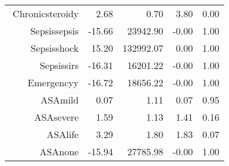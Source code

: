\begin{tabular}{rrrrr}
$$  Chronic\-steroid\-y & 2.68 & 0.70 & 3.80 & 0.00 \\ 
  Sepsis\-sepsis & -15.66 & 23942.90 & -0.00 & 1.00 \\ 
  Sepsis\-shock & 15.20 & 132992.07 & 0.00 & 1.00 \\ 
  Sepsis\-sirs & -16.31 & 16201.22 & -0.00 & 1.00 \\ 
  Emergency\-y & -16.72 & 18656.22 & -0.00 & 1.00 \\ 
  ASA\-mild & 0.07 & 1.11 & 0.07 & 0.95 \\ 
  ASA\-severe & 1.59 & 1.13 & 1.41 & 0.16 \\ 
  ASA\-life & 3.29 & 1.80 & 1.83 & 0.07 \\ 
  ASA\-none & -15.94 & 27785.98 & -0.00 & 1.00 \\ 
   \hline
\end{tabular}

